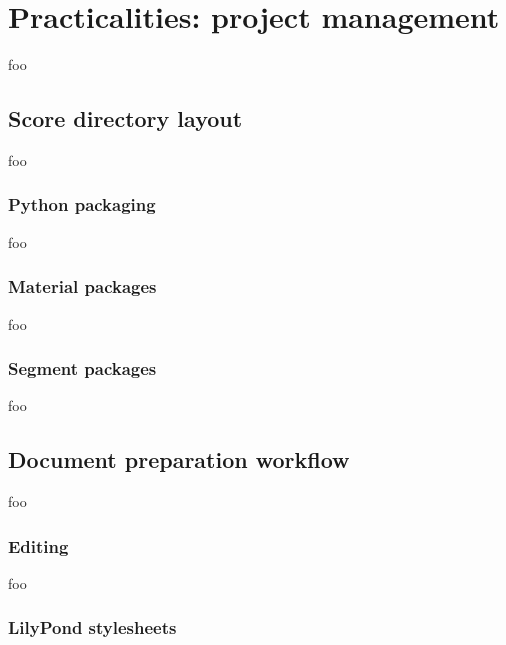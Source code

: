 \chapter{Practicalities: project management}

foo

\section{Score directory layout}

foo

\subsection{Python packaging}

foo

\subsection{Material packages}

foo

\subsection{Segment packages}

foo

\section{Document preparation workflow}

foo

\subsection{Editing}

foo

\subsection{LilyPond stylesheets}


